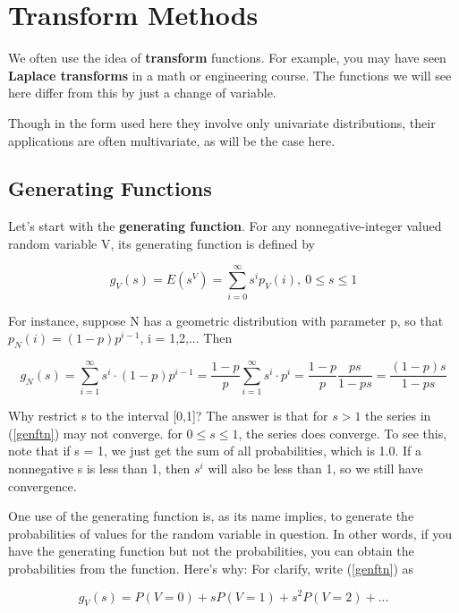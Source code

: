 \chapter{Transform Methods}
\label{chap:xform}

We often use the idea of \textbf{transform} functions.  For example, you
may have seen \textbf{Laplace transforms} in a math or engineering
course.  The functions we will see here differ from this by just
a change of variable. 

Though in the form used here they involve only univariate distributions,
their applications are often multivariate, as will be the case here.

\section{Generating Functions}

Let's start with the \textbf{generating function}.
For any nonnegative-integer valued
random variable V, its generating function is defined by

\begin{equation}
\label{genftn}
g_V(s)=E(s^{V}) = \sum_{i=0}^\infty s^i p_V(i), ~ 0 \leq s \leq 1
\end{equation}

For instance, suppose N has a geometric distribution with parameter p,
so that $p_N(i) = (1-p) p^{i-1}$, i = 1,2,...  Then

\begin{equation}
g_N(s) = \sum_{i=1}^\infty s^i \cdot (1-p) p^{i-1} 
= \frac{1-p}{p} \sum_{i=1}^\infty s^i \cdot p^i 
= \frac{1-p}{p} \frac{ps}{1-ps}
= \frac{(1-p)s}{1-ps}
\end{equation}

Why restrict s to the interval [0,1]?  The answer is that for $s > 1$
the series in (\ref{genftn}) may not converge.  for $0 \leq s \leq 1$,
the series does converge.  To see this, note that if s = 1, we just get
the sum of all probabilities, which is 1.0.  If a nonnegative s is less
than 1, then $s^i$ will also be less than 1, so we still have
convergence.

One use of the generating function is, as its name implies, to generate
the probabilities of values for the random variable in question.  In
other words, if you have the generating function but not the
probabilities, you can obtain the probabilities from the function.
Here's why:  For clarify, write (\ref{genftn}) as

\begin{equation}
g_V(s) = P(V=0) + s P(V=1) + s^2 P(V=2) + ...  
\end{equation}

